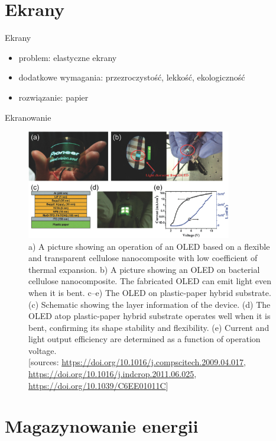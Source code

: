 \documentclass{beamer}
\begin{document}
\section{Ekrany}

\begin{frame}{Ekrany}
    \begin{itemize}
\item problem: elastyczne ekrany
\item dodatkowe wymagania: przezroczystość, lekkość, ekologiczność
\item rozwiązanie: papier
\end{itemize}
\end{frame}

\begin{frame}{Ekranowanie}
    \begin{figure}
        \centering
        \includegraphics[width=0.8\textwidth]{fig8.jpg}
        \caption{a) A picture showing an operation of an OLED based on a flexible and transparent cellulose nanocomposite with low coefficient of thermal expansion. b) A picture showing an OLED on bacterial cellulose nanocomposite. The fabricated OLED can emit light even when it is bent. c–e) The OLED on plastic-paper hybrid substrate. (c) Schematic showing the layer information of the device. (d) The OLED atop plastic-paper hybrid substrate operates well when it is bent, confirming its shape stability and flexibility. (e) Current and light output efficiency are determined as a function of operation voltage.\\\typeout{}
        [sources: \url{https://doi.org/10.1016/j.compscitech.2009.04.017}, \url{https://doi.org/10.1016/j.indcrop.2011.06.025}, \url{https://doi.org/10.1039/C6EE01011C}]}
    \end{figure}
\end{frame}

\section{Magazynowanie energii}
\end{document}
